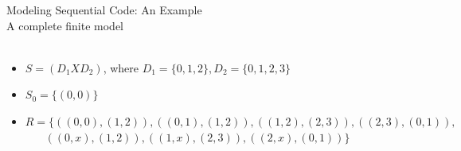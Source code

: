 \documentclass{beamer}
\begin{document}
\begin{frame}{Modeling Sequential Code: An Example \\
\small{A complete finite model}}
\hfill
{} \\
 \\
\begin{itemize}
\item<3-> $S = (D_1 X D_2)$, where $D_1 = \{0,1,2\}, D_2 = \{0,1,2,3\}$
\item<3-> $S_0 = \{(0,0)\}$
\item<3-> $R = \{ ((0,0),(1,2)), ((0,1),(1,2)), ((1,2),(2,3)), ((2,3),(0,1)),$ \\
$~~~~~~~~((0,x), (1,2)), ((1,x), (2,3)), ((2,x), (0,1))\}$
\end{itemize}
\end{frame}
\end{document}
